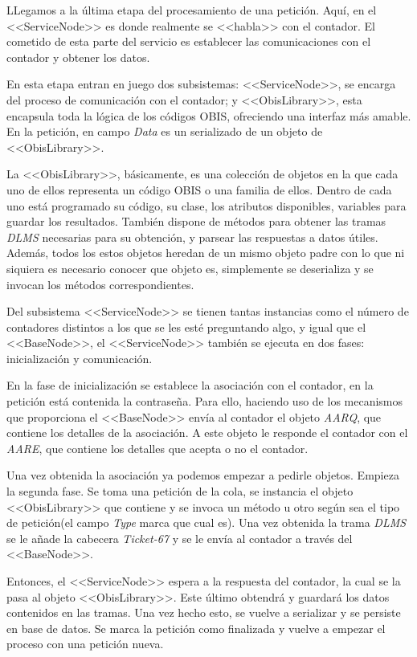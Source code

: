 LLegamos a la última etapa del procesamiento de una petición. Aquí, en el <<ServiceNode>> es donde realmente se <<habla>> con el contador. El cometido de esta parte del servicio es establecer las comunicaciones con el contador y obtener los datos.

En esta etapa entran en juego dos subsistemas: <<ServiceNode>>, se encarga del proceso de comunicación con el contador; y <<ObisLibrary>>, esta encapsula toda la lógica de los códigos OBIS, ofreciendo una interfaz más amable. En la petición, en campo \textsl{Data} es un serializado de un objeto de <<ObisLibrary>>.

La <<ObisLibrary>>, básicamente, es una colección de objetos en la que cada uno de ellos representa un código OBIS o una familia de ellos. Dentro de cada uno está programado su código, su clase, los atributos disponibles, variables para guardar los resultados. También dispone de métodos para obtener las tramas \textsl{DLMS} necesarias para su obtención, y parsear las respuestas a datos útiles. Además, todos los estos objetos heredan de un mismo objeto padre con lo que ni siquiera es necesario conocer que objeto es, simplemente se deserializa y se invocan los métodos correspondientes.

Del subsistema <<ServiceNode>> se tienen tantas instancias como el número de contadores distintos a los que se les esté preguntando algo, y igual que el <<BaseNode>>, el <<ServiceNode>> también se ejecuta en dos fases: inicialización y comunicación.

En la fase de inicialización se establece la asociación con el contador, en la petición está contenida la contraseña. Para ello, haciendo uso de los mecanismos que proporciona el <<BaseNode>> envía al contador el objeto \textsl{AARQ}, que contiene los detalles de la asociación. A este objeto le responde el contador con el \textsl{AARE}, que contiene los detalles que acepta o no el contador. 

Una vez obtenida la asociación ya podemos empezar a pedirle objetos. Empieza la segunda fase. Se toma una petición de la cola, se instancia el objeto <<ObisLibrary>> que contiene y se invoca un método u otro según sea el tipo de petición(el campo \textsl{Type} marca que cual es). Una vez obtenida la trama \textsl{DLMS} se le añade la cabecera \textsl{Ticket-67} y se le envía al contador a través del <<BaseNode>>. 

Entonces, el <<ServiceNode>> espera a la respuesta del contador, la cual se la pasa al objeto <<ObisLibrary>>. Este último obtendrá y guardará los datos contenidos en las tramas. Una vez hecho esto, se vuelve a serializar y se persiste en base de datos. Se marca la petición como finalizada y vuelve a empezar el proceso con una petición nueva. 


